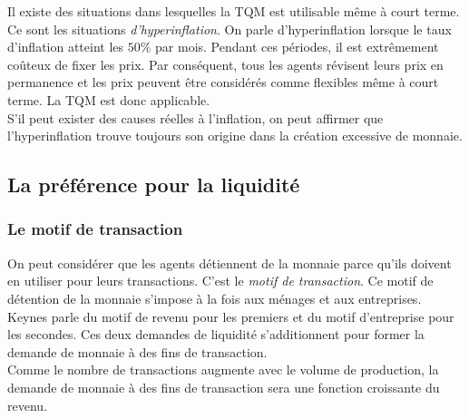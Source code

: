\documentclass[10pt]{book}
\begin{document}
Il existe des situations dans lesquelles la TQM est utilisable même à court terme. Ce sont les situations \textit{d'hyperinflation}. On parle d'hyperinflation lorsque le taux d'inflation atteint les $50\%$ par mois. Pendant ces périodes, il est extrêmement coûteux de fixer les prix. Par conséquent, tous les agents révisent leurs prix en permanence et les prix peuvent être considérés comme flexibles même à court terme. La TQM est donc applicable. \\
S'il peut exister des causes réelles à l'inflation, on peut affirmer que l'hyperinflation trouve toujours son origine dans la création excessive de monnaie.
\subsection{La préférence pour la liquidité}
\subsubsection{Le motif de transaction}
On peut considérer que les agents détiennent de la monnaie parce qu'ils doivent en utiliser pour leurs transactions. C'est le \textit{motif de transaction}. Ce motif de détention de la monnaie s'impose à la fois aux ménages et aux entreprises. Keynes parle du motif de revenu pour les premiers et du motif d'entreprise pour les secondes. Ces deux demandes de liquidité s'additionnent pour former la demande de monnaie à des fins de transaction. \\
Comme le nombre de transactions augmente avec le volume de production, la demande de monnaie à des fins de transaction sera une fonction croissante du revenu.
\end{document}
